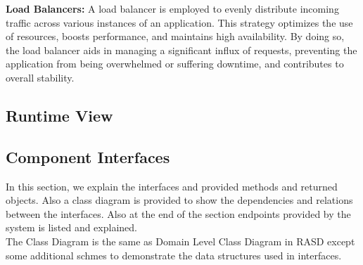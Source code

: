 \indent \textbf{Load Balancers:} A load balancer is employed to evenly distribute incoming traffic across various instances of an application. This strategy optimizes the use of resources, boosts performance, and maintains high availability. By doing so, the load balancer aids in managing a significant influx of requests, preventing the application from being overwhelmed or suffering downtime, and contributes to overall stability.



\subsection{Runtime View}




\subsection{Component Interfaces}
In this section, we explain the interfaces and provided methods and returned objects. Also a class diagram is provided to show the dependencies and relations between the interfaces. Also at the end of the section endpoints provided by the system is listed and explained.
\\
The Class Diagram is the same as Domain Level Class Diagram in RASD except some additional schmes to demonstrate the data structures used in interfaces.
